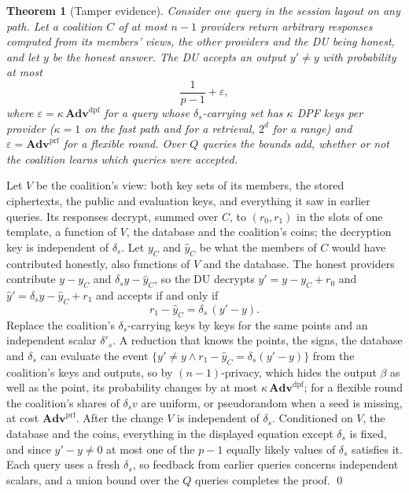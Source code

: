 \documentclass[a4paper,fleqn]{cas-sc}
\newtheorem{theorem}{Theorem}
\newcommand{\advPRF}{\mathbf{Adv}^{\mathrm{prf}}}
\newcommand{\advDPF}{\mathbf{Adv}^{\mathrm{dpf}}}
\begin{document}
\begin{theorem}[Tamper evidence]
\label{thm:tamper}
Consider one query in the session layout on any path. Let a coalition $C$ of at
most $n-1$ providers return arbitrary responses computed from its members'
views, the other providers and the DU being honest, and let $y$ be the honest
answer. The DU accepts an output $y'\neq y$ with probability at most
\[
\frac{1}{p-1}+\varepsilon,
\]
where $\varepsilon=\kappa\,\advDPF$ for a query whose $\delta_s$-carrying set
has $\kappa$ DPF keys per provider ($\kappa=1$ on the fast path and for a
retrieval, $2^d$ for a range) and $\varepsilon=\advPRF$ for a flexible round. Over $Q$ queries the
bounds add, whether or not the coalition learns which queries were accepted.
\end{theorem}
\begin{pf}
Let $V$ be the coalition's view: both key sets of its members, the stored
ciphertexts, the public and evaluation keys, and everything it saw in earlier
queries. Its responses decrypt, summed over $C$, to $(r_0,r_1)$ in the slots of
one template, a function of $V$, the database and the coalition's coins; the
decryption key is independent of $\delta_s$. Let $y_C$ and $\hat y_C$ be what
the members of $C$ would have contributed honestly, also functions of $V$ and
the database. The honest providers contribute $y-y_C$ and
$\delta_sy-\hat y_C$, so the DU decrypts $y'=y-y_C+r_0$ and
$\hat y'=\delta_sy-\hat y_C+r_1$ and accepts if and only if
\[
r_1-\hat y_C=\delta_s\,(y'-y).
\]
Replace the coalition's $\delta_s$-carrying keys by keys for the same points
and an independent scalar $\delta'_s$. A reduction that knows the points, the
signs, the database and $\delta_s$ can evaluate the event
$\{y'\neq y\wedge r_1-\hat y_C=\delta_s(y'-y)\}$ from the coalition's keys and
outputs, so by $(n{-}1)$-privacy, which hides the output $\beta$ as well as the
point, its probability changes by at most $\kappa\,\advDPF$; for a flexible
round the coalition's shares of $\delta_sv$ are uniform, or pseudorandom when a
seed is missing, at cost $\advPRF$. After the change $V$ is independent of
$\delta_s$. Conditioned on $V$, the database and the coins, everything in the
displayed equation except $\delta_s$ is fixed, and since $y'-y\neq0$ at most one
of the $p-1$ equally likely values of $\delta_s$ satisfies it. Each query uses
a fresh $\delta_s$, so feedback from earlier queries concerns independent
scalars, and a union bound over the $Q$ queries completes the proof. \qed
\end{pf}
\end{document}
